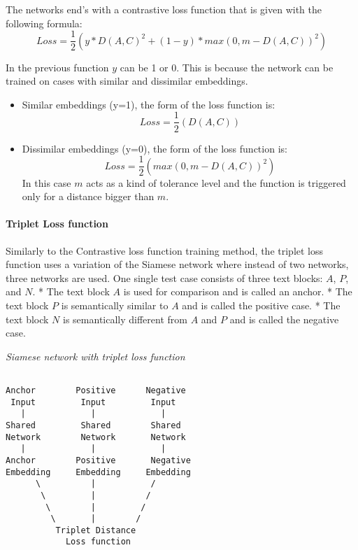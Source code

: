 \documentclass{wseas}
\begin{document}
The networks end's with a contrastive loss function that is given with
the following formula: 
\[ Loss =  \frac{1}{2} (y*D(A,C)^2 + (1-y)*max(0,m-D(A,C))^2) \]

In the previous function \(y\) can be 1 or 0. This is because the
network can be trained on cases with similar and dissimilar embeddings.

\begin{itemize}
\item
  Similar embeddings (y=1), the form of the loss function is: \[
   Loss = \frac{1}{2}(D(A,C))
   \]
\item
  Dissimilar embeddings (y=0), the form of the loss function is: \[
  Loss =  \frac{1}{2}(max(0,m-D(A,C))^2)
  \] In this case \(m\) acts as a kind of tolerance level and the
  function is triggered only for a distance bigger than \(m\).
\end{itemize}


\paragraph{Triplet Loss function}\label{triplet-loss-function}

Similarly to the Contrastive loss function training method, the triplet
loss function uses a variation of the Siamese network where instead of
two networks, three networks are used. One single test case consists of
three text blocks: \(A\), \(P\), and \(N\). * The text block \(A\) is
used for comparison and is called an anchor. * The text block \(P\) is
semantically similar to \(A\) and is called the positive case. * The
text block \(N\) is semantically different from \(A\) and \(P\) and is
called the negative case.

\emph{Siamese network with triplet loss function}

\begin{verbatim}
                   
Anchor        Positive      Negative
 Input         Input         Input
   |             |             |
Shared         Shared        Shared
Network        Network       Network
   |             |             |
Anchor        Positive       Negative
Embedding     Embedding     Embedding
      \          |           /
       \         |          /  
        \        |         /
         \       |        /
          Triplet Distance
            Loss function     
\end{verbatim}
\end{document}
